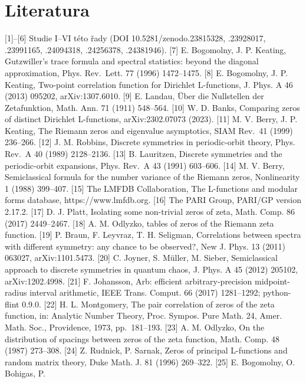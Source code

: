 \documentclass[
  10pt,
]{article}
\begin{document}
\hypertarget{literatura}{%
\section{Literatura}\label{literatura}}
\small

{[}1{]}--{[}6{]} Studie I--VI této řady (DOI 10.5281/zenodo.23815328,
.23928017, .23991165, .24094318, .24256378, .24381946). {[}7{]} E.
Bogomolny, J. P. Keating, Gutzwiller's trace formula and spectral
statistics: beyond the diagonal approximation, Phys. Rev.~Lett. 77
(1996) 1472--1475. {[}8{]} E. Bogomolny, J. P. Keating, Two-point
correlation function for Dirichlet L-functions, J. Phys. A 46 (2013)
095202, arXiv:1307.6010. {[}9{]} E. Landau, Über die Nullstellen der
Zetafunktion, Math. Ann. 71 (1911) 548--564. {[}10{]} W. D. Banks,
Comparing zeros of distinct Dirichlet L-functions, arXiv:2302.07073
(2023). {[}11{]} M. V. Berry, J. P. Keating, The Riemann zeros and
eigenvalue asymptotics, SIAM Rev.~41 (1999) 236--266. {[}12{]} J. M.
Robbins, Discrete symmetries in periodic-orbit theory, Phys. Rev.~A 40
(1989) 2128--2136. {[}13{]} B. Lauritzen, Discrete symmetries and the
periodic-orbit expansions, Phys. Rev.~A 43 (1991) 603--606. {[}14{]} M.
V. Berry, Semiclassical formula for the number variance of the Riemann
zeros, Nonlinearity 1 (1988) 399--407. {[}15{]} The LMFDB Collaboration,
The L-functions and modular forms database, https://www.lmfdb.org.
{[}16{]} The PARI Group, PARI/GP version 2.17.2. {[}17{]} D. J. Platt,
Isolating some non-trivial zeros of zeta, Math. Comp. 86 (2017)
2449--2467. {[}18{]} A. M. Odlyzko, tables of zeros of the Riemann zeta
function. {[}19{]} P. Braun, F. Leyvraz, T. H. Seligman, Correlations
between spectra with different symmetry: any chance to be observed?, New
J. Phys. 13 (2011) 063027, arXiv:1101.5473. {[}20{]} C. Joyner, S.
Müller, M. Sieber, Semiclassical approach to discrete symmetries in
quantum chaos, J. Phys. A 45 (2012) 205102, arXiv:1202.4998. {[}21{]} F.
Johansson, Arb: efficient arbitrary-precision midpoint-radius interval
arithmetic, IEEE Trans. Comput. 66 (2017) 1281--1292; python-flint
0.9.0. {[}22{]} H. L. Montgomery, The pair correlation of zeros of the
zeta function, in: Analytic Number Theory, Proc. Sympos. Pure Math. 24,
Amer. Math. Soc., Providence, 1973, pp.~181--193. {[}23{]} A. M.
Odlyzko, On the distribution of spacings between zeros of the zeta
function, Math. Comp. 48 (1987) 273--308. {[}24{]} Z. Rudnick, P.
Sarnak, Zeros of principal L-functions and random matrix theory, Duke
Math. J. 81 (1996) 269--322. {[}25{]} E. Bogomolny, O. Bohigas, P.
\end{document}
